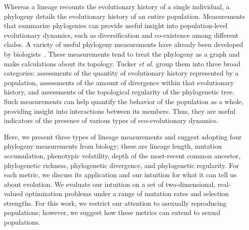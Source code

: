 \documentclass[letterpaper]{article}
\begin{document}
Whereas a lineage recounts the evolutionary history of a single individual, a phylogeny details the evolutionary history of an entire population. Measurements that summarize phylogenies can provide useful insight into population-level evolutionary dynamics, such as diversification and co-existence among different clades. A variety of useful phylogeny measurements have already been developed by biologists~\citep{tucker_guide_2017}. These measurements tend to treat the phylogeny as a graph and make calculations about its topology. Tucker \textit{et al.} group them into three broad categories: assessments of the quantity of evolutionary history represented by a population, assessments of the amount of divergence within that evolutionary history, and assessments of the topological regularity of the phylogenetic tree. Such measurements can help quantify the behavior of the population as a whole, providing insight into interactions between its members. Thus, they are useful indicators of the presence of various types of eco-evolutionary dynamics.

Here, we present three types of lineage measurements and suggest adopting four phylogeny measurements from biology; these are lineage length, mutation accumulation, phenotypic volatility, depth of the most-recent common ancestor, phylogenetic richness, phylogenetic divergence, and phylogenetic regularity.
For each metric, we discuss its application and our intuition for what it can tell us about evolution. We evaluate our intuition on a set of two-dimensional, real-valued optimization problems under a range of mutation rates and selection strengths. For this work, we restrict our attention to asexually reproducing populations; however, we suggest how these metrics can extend to sexual populations. 
\end{document}
